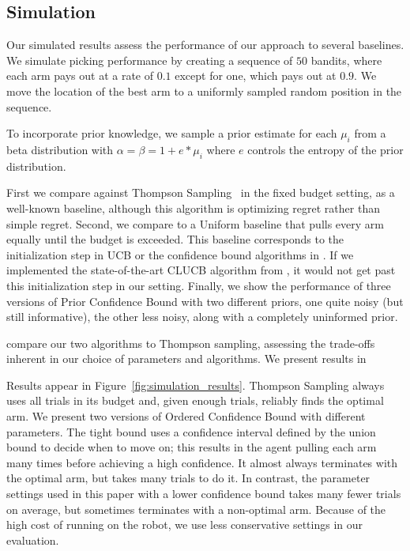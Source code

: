 \documentclass{article}
\newcommand{\algorithmCTxt}{Ordered Confidence Bound\xspace}
\newcommand{\algorithmDTxt}{Prior Confidence Bound\xspace}
\begin{document}
\subsection{Simulation}

Our simulated results assess the performance of our approach to
several baselines.  We simulate picking performance by creating a
sequence of $50$ bandits, where each arm pays out at a rate of $0.1$
except for one, which pays out at $0.9$.  We move the location of the
best arm to a uniformly sampled random position in the sequence. 

To incorporate prior knowledge, we sample a prior estimate for each
$\mu_i$ from a beta distribution with $\alpha = \beta = 1 + e * \mu_i$
where $e$ controls the entropy of the prior distribution.


First we compare against Thompson Sampling~\citep{thompson33} in the
fixed budget setting, as a well-known baseline, although this
algorithm is optimizing regret rather than simple regret.  Second, we
compare to a Uniform baseline that pulls every arm equally until the
budget is exceeded.  This baseline corresponds to the initialization
step in UCB or the confidence bound algorithms in \citet{chen14}.  If
we implemented the state-of-the-art CLUCB algorithm from
\citet{chen14}, it would not get past this initialization step in our
setting.  Finally, we show the performance of three versions of
\algorithmDTxt with two different priors, one quite noisy (but still
informative), the other less noisy, along with a completely uninformed
prior.



 compare our two algorithms to Thompson
sampling, assessing the trade-offs inherent in our choice of
parameters and algorithms.  We present results in

Results appear in Figure~\ref{fig:simulation_results}.  Thompson Sampling always uses all
trials in its budget and, given enough trials, reliably finds the
optimal arm.  We present two versions of \algorithmCTxt with different
parameters.  The tight bound uses a confidence interval defined by the
union bound to decide when to move on; this results in the agent
pulling each arm many times before achieving a high confidence.  It
almost always terminates with the optimal arm, but takes many trials
to do it.  In contrast, the parameter settings used in this paper with
a lower confidence bound takes many fewer trials on average, but
sometimes terminates with a non-optimal arm.  Because of the high cost
of running on the robot, we use less conservative settings in our
evaluation.
\end{document}
